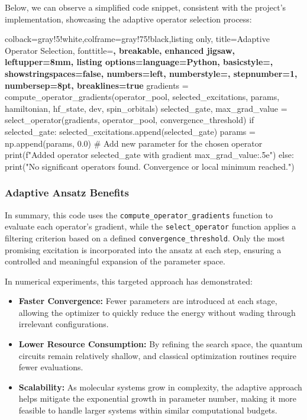 Below, we can observe a simplified code snippet, consistent with the project’s implementation, showcasing the adaptive operator selection process:

\begin{tcblisting}{colback=gray!5!white,colframe=gray!75!black,listing only,
  title=Adaptive Operator Selection, fonttitle=\bfseries, breakable, enhanced jigsaw, leftupper=8mm,
  listing options={language=Python, basicstyle=\ttfamily\small,
  showstringspaces=false, numbers=left, numberstyle=\footnotesize, stepnumber=1, numbersep=8pt, breaklines=true}}
gradients = compute_operator_gradients(operator_pool, selected_excitations, params, hamiltonian, hf_state, dev, spin_orbitals)
selected_gate, max_grad_value = select_operator(gradients, operator_pool, convergence_threshold)
if selected_gate:
    selected_excitations.append(selected_gate)
    params = np.append(params, 0.0)  # Add new parameter for the chosen operator
    print(f"Added operator {selected_gate} with gradient {max_grad_value:.5e}")
else:
    print("No significant operators found. Convergence or local minimum reached.")
\end{tcblisting}
\subsubsection{Adaptive Ansatz Benefits}
In summary, this code uses the \texttt{compute\_operator\_gradients} function to evaluate each operator’s gradient, while the \texttt{select\_operator} function applies a filtering criterion based on a defined \texttt{convergence\_threshold}. Only the most promising excitation is incorporated into the ansatz at each step, ensuring a controlled and meaningful expansion of the parameter space.

In numerical experiments, this targeted approach has demonstrated:
\begin{itemize}
    \item \textbf{Faster Convergence:} Fewer parameters are introduced at each stage, allowing the optimizer to quickly reduce the energy without wading through irrelevant configurations.
    \item \textbf{Lower Resource Consumption:} By refining the search space, the quantum circuits remain relatively shallow, and classical optimization routines require fewer evaluations.
    \item \textbf{Scalability:} As molecular systems grow in complexity, the adaptive approach helps mitigate the exponential growth in parameter number, making it more feasible to handle larger systems within similar computational budgets.
\end{itemize}



